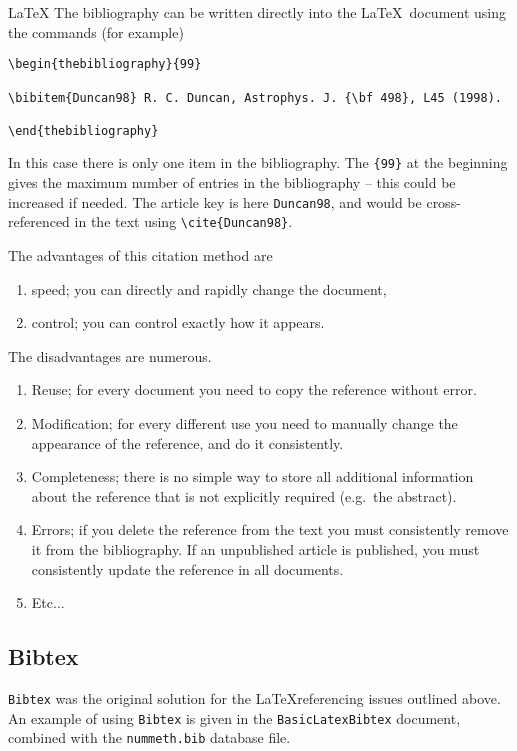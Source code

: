 \begin{chapter}{\LaTeX}
The bibliography can be written directly into the \LaTeX\ document using the commands (for example)
%
\begin{verbatim}
\begin{thebibliography}{99}

\bibitem{Duncan98} R. C. Duncan, Astrophys. J. {\bf 498}, L45 (1998).

\end{thebibliography}
\end{verbatim}
%
In this case there is only one item in the bibliography. The \verb|{99}| at the beginning gives the maximum number of entries in the bibliography -- this could be increased if needed. The article key is here \verb|Duncan98|, and would be cross-referenced in the text using \verb|\cite{Duncan98}|.

The advantages of this citation method are
\begin{enumerate}
\item speed; you can directly and rapidly change the document,
\item control; you can control exactly how it appears.
\end{enumerate}

The disadvantages are numerous.
\begin{enumerate}
\item Reuse; for every document you need to copy the reference without error.
\item Modification; for every different use you need to manually change the appearance of the reference, and do it consistently.
\item Completeness; there is no simple way to store all additional information about the reference that is not explicitly required (e.g.\ the abstract).
\item Errors; if you delete the reference from the text you must consistently remove it from the bibliography. If an unpublished article is published, you must consistently update the reference in all documents.
\item Etc...
\end{enumerate}

\subsection{Bibtex}
\label{sec:bibtex}

\verb|Bibtex| was the original solution for the \LaTeX referencing issues outlined above. An example of using \verb|Bibtex| is given in the \verb|BasicLatexBibtex| document, combined with the \verb|nummeth.bib| database file.


\end{chapter}
